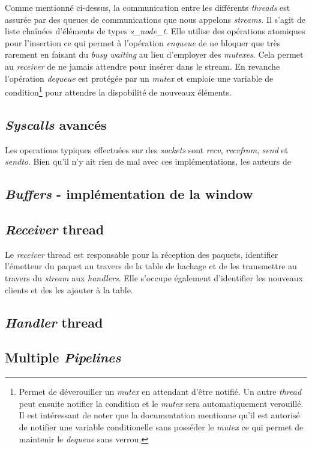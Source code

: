 \documentclass[../main.tex]{subfiles}
\begin{document}
Comme mentionné ci-dessus, la communication entre les différents \textit{threads} est assurée par des queues de communications que nous appelons \textit{streams}.
Il s'agit de liste chaînées d'éléments de types \textit{s\_node\_t}. Elle utilise des opérations atomiques pour l'insertion ce qui permet
à l'opération \textit{enqueue} de ne bloquer que très rarement en faisant du \textit{busy waiting} au lieu d'employer des \textit{mutexes}. Cela permet
au \textit{receiver} de ne jamais attendre pour insérer dans le stream. En revanche l'opération \textit{dequeue} est protégée par un \textit{mutex} et
emploie une variable de condition\footnote{ Permet de déverouiller un \textit{mutex} en attendant d'être notifié. Un autre \textit{thread} peut ensuite notifier
la condition et le \textit{mutex} sera automatiquement verouillé. Il est intéressant de noter que la documentation mentionne qu'il est autorisé
de notifier une variable conditionelle sans posséder le \textit{mutex} ce qui permet de maintenir le \textit{dequeue} sans verrou. } pour attendre la dispobilité de nouveaux éléments.

\subsection{\textit{Syscalls} avancés}
\label{sec:syscalls}

Les operations typiques effectuées sur des \textit{sockets} sont \textit{recv}, \textit{recvfrom}, \textit{send} et \textit{sendto}. Bien qu'il n'y ait rien
de mal avec ces implémentations, les auteurs de \cite{that_awesome_paper}

\subsection{\textit{Buffers} - implémentation de la window}
\label{sec:syscalls}

\subsection{\textit{Receiver} thread}
\label{sec:receiver}

Le \textit{receiver} thread est responsable pour la réception des paquets, identifier l'émetteur du paquet au travers de la table de hachage
et de les transmettre au travers du \textit{stream} aux \textit{handlers}. Elle s'occupe également d'identifier les nouveaux clients et 
des les ajouter à la table. 

\subsection{\textit{Handler} thread}
\label{sec:handler}

\subsection{Multiple \textit{Pipelines}}
\label{sec:pipelines}
\end{document}
